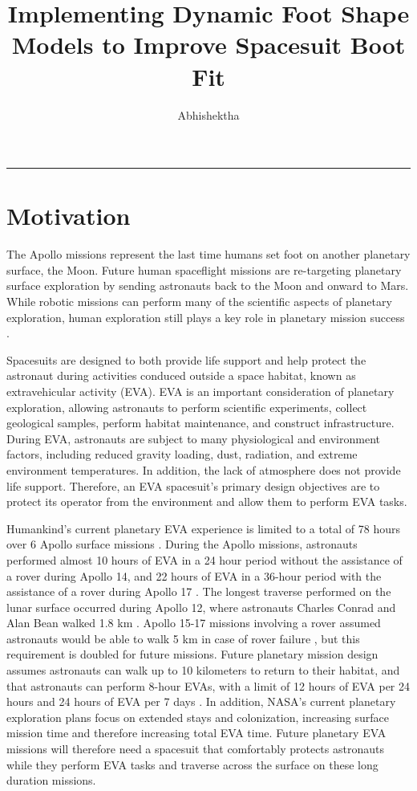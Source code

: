 \documentclass[defaultstyle,11pt]{thesis}
\title{Implementing Dynamic Foot Shape Models to Improve Spacesuit Boot Fit}
\author{Abhishektha}{Boppana}
\begin{document}
\begin{center}\rule{0.5\linewidth}{0.5pt}\end{center}

\hypertarget{chapter:motiv}{%
\chapter{Motivation}\label{chapter:motiv}}

The Apollo missions represent the last time humans set foot on another planetary surface, the Moon.
Future human spaceflight missions are re-targeting planetary surface exploration by sending astronauts back to the Moon and onward to Mars.
While robotic missions can perform many of the scientific aspects of planetary exploration, human exploration still plays a key role in planetary mission success \citep{Drake2010}.

Spacesuits are designed to both provide life support and help protect the astronaut during activities conduced outside a space habitat, known as extravehicular activity (EVA).
EVA is an important consideration of planetary exploration, allowing astronauts to perform scientific experiments, collect geological samples, perform habitat maintenance, and construct infrastructure.
During EVA, astronauts are subject to many physiological and environment factors, including reduced gravity loading, dust, radiation, and extreme environment temperatures.
In addition, the lack of atmosphere does not provide life support.
Therefore, an EVA spacesuit's primary design objectives are to protect its operator from the environment and allow them to perform EVA tasks.

Humankind's current planetary EVA experience is limited to a total of 78 hours over 6 Apollo surface missions \citep{Portree1997}.
During the Apollo missions, astronauts performed almost 10 hours of EVA in a 24 hour period without the assistance of a rover during Apollo 14, and 22 hours of EVA in a 36-hour period with the assistance of a rover during Apollo 17 \citep{Portree1997}.
The longest traverse performed on the lunar surface occurred during Apollo 12, where astronauts Charles Conrad and Alan Bean walked 1.8 km \citep{Portree1997}.
Apollo 15-17 missions involving a rover assumed astronauts would be able to walk 5 km in case of rover failure \citep{Portree1997}, but this requirement is doubled for future missions.
Future planetary mission design assumes astronauts can walk up to 10 kilometers to return
to their habitat, and that astronauts can perform 8-hour EVAs, with a limit of 12 hours of EVA per 24 hours and 24 hours of EVA per 7 days \citep{Drake2010}.
In addition, NASA's current planetary exploration plans focus on extended stays and colonization, increasing surface mission time and therefore increasing total EVA time.
Future planetary EVA missions will therefore need a spacesuit that comfortably protects astronauts while they perform EVA tasks and traverse across the surface on these long duration missions.
\end{document}
